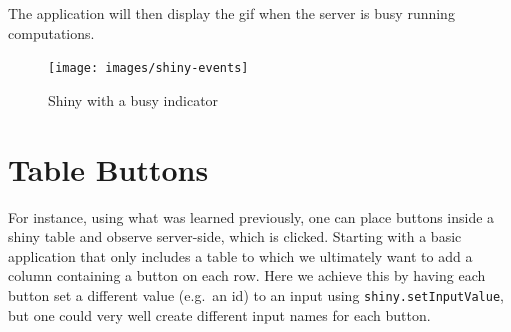 \documentclass[
  10pt,
]{krantz}
\makeatletter
\newenvironment{Shaded}{\begin{snugshade}}{\end{snugshade}}
\newcommand{\ControlFlowTok}[1]{\textcolor[rgb]{0.27,0.27,0.27}{\textbf{#1}}}
\newcommand{\DataTypeTok}[1]{\textcolor[rgb]{0.27,0.27,0.27}{#1}}
\newcommand{\KeywordTok}[1]{\textcolor[rgb]{0.27,0.27,0.27}{\textbf{#1}}}
\newcommand{\NormalTok}[1]{#1}
\newcommand{\OperatorTok}[1]{\textcolor[rgb]{0.43,0.43,0.43}{\textbf{#1}}}
\newcommand{\OtherTok}[1]{\textcolor[rgb]{0.37,0.37,0.37}{#1}}
\newcommand{\StringTok}[1]{\textcolor[rgb]{0.5,0.5,0.5}{#1}}
\newenvironment{kframe}{%
\medskip{}
\setlength{\fboxsep}{.8em}
 \def\at@end@of@kframe{}%
 \ifinner\ifhmode%
  \def\at@end@of@kframe{\end{minipage}}%
  \begin{minipage}{\columnwidth}%
 \fi\fi%
 \def\FrameCommand##1{\hskip\@totalleftmargin \hskip-\fboxsep
 \colorbox{shadecolor}{##1}\hskip-\fboxsep
     \hskip-\linewidth \hskip-\@totalleftmargin \hskip\columnwidth}%
 \MakeFramed {\advance\hsize-\width
   \@totalleftmargin\z@ \linewidth\hsize
   \@setminipage}}%
 {\par\unskip\endMakeFramed%
 \at@end@of@kframe}
\renewenvironment{Shaded}{\begin{kframe}}{\end{kframe}}
\makeatother
\begin{document}
The application will then display the gif when the server is busy running computations.

\begin{figure}[H]

{\centering \texttt{[image: images/shiny-events]} 

}

\caption{Shiny with a busy indicator}\label{fig:shiny-events}
\end{figure}

\hypertarget{shiny-tips-table-btn}{%
\section{Table Buttons}\label{shiny-tips-table-btn}}

For instance, using what was learned previously, one can place buttons inside a shiny table and observe server-side, which is clicked. Starting with a basic application that only includes a table to which we ultimately want to add a column containing a button on each row. Here we achieve this by having each button set a different value (e.g.~an id) to an input using \texttt{shiny.setInputValue}, but one could very well create different input names for each button.

\begin{Shaded}
\end{Shaded}
\end{document}
